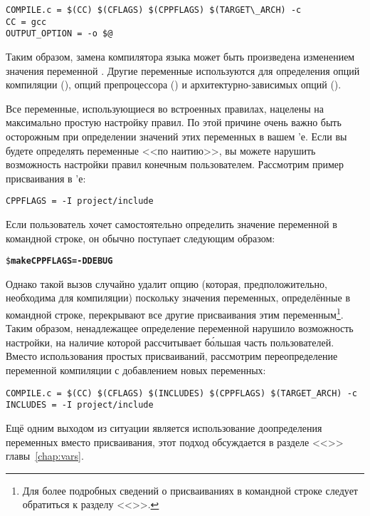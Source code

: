 {\footnotesize
\begin{verbatim}
COMPILE.c = $(CC) $(CFLAGS) $(CPPFLAGS) $(TARGET\_ARCH) -c
CC = gcc
OUTPUT_OPTION = -o $@
\end{verbatim}
}

Таким образом, замена компилятора языка \Clang{} может быть
произведена изменением значения переменной . Другие
переменные используются для определения опций компиляции
(), опций препроцессора () и
архитектурно\hyp{}зависимых опций ().

Все переменные, использующиеся во встроенных правилах, нацелены на
максимально простую настройку правил. По этой причине очень важно
быть осторожным при определении значений этих переменных в вашем
\Makefile{}'е. Если вы будете определять переменные <<по наитию>>,
вы можете нарушить возможность настройки правил конечным
пользователем. Рассмотрим пример присваивания в \Makefile{}'е:

{\footnotesize
\begin{verbatim}
CPPFLAGS = -I project/include
\end{verbatim}
}

Если пользователь хочет самостоятельно определить значение переменной
в командной строке, он обычно поступает следующим образом:

\begin{alltt}
\footnotesize
\$ \textbf{make CPPFLAGS=-DDEBUG}
\end{alltt}

Однако такой вызов случайно удалит опцию  (которая,
предположительно, необходима для компиляции) поскольку значения
переменных, определённые в командной строке, перекрывают все другие
присваивания этим переменным\footnote{Для более подробных сведений о
присваиваниях в командной строке следует обратиться к
разделу <<>>.}. Таким образом,
ненадлежащее определение переменной  нарушило
возможность настройки, на наличие которой рассчитывает б\'{о}льшая
часть пользователей. Вместо использования простых присваиваний,
рассмотрим переопределение переменной компиляции с добавлением новых
переменных:

{\footnotesize
\begin{verbatim}
COMPILE.c = $(CC) $(CFLAGS) $(INCLUDES) $(CPPFLAGS) $(TARGET_ARCH) -c
INCLUDES = -I project/include
\end{verbatim}
}

Ещё одним выходом из ситуации является использование доопределения
переменных вместо присваивания, этот подход обсуждается в разделе
<<>> главы~\ref{chap:vars}.

